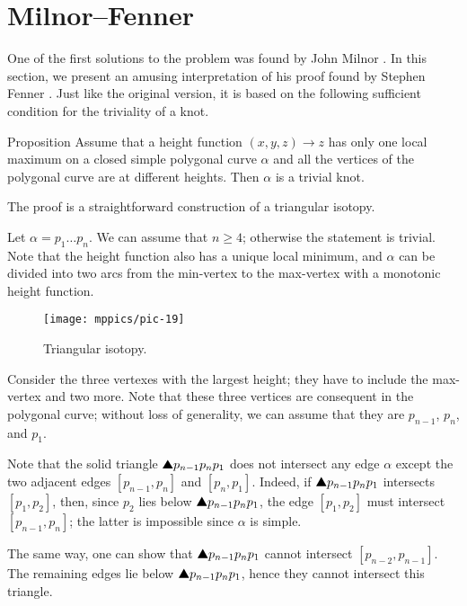 \section{Milnor--Fenner}

One of the first solutions to the problem was found by John Milnor \cite{milnor}.
In this section, we present an amusing interpretation of his proof found by Stephen Fenner \cite{ferner}.
Just like the original version, it is based on the following sufficient condition for the triviality of a knot.

\begin{thm}{Proposition}\label{prop:one-max-one-min}
Assume that a height function $(x,y,z)\to z$ 
has only one local maximum on a closed simple polygonal curve $\alpha$ and all the vertices of the polygonal curve are at different heights.
Then $\alpha$ is a trivial knot.
\end{thm}

The proof is a straightforward construction of a triangular isotopy. 

Let $\alpha=p_1\dots p_n$.
We can assume that $n\ge 4$; otherwise the statement is trivial.
Note that the height function also has a unique local minimum, and $\alpha$ can be divided into two arcs from the min-vertex to the max-vertex with a monotonic height function.

{

\begin{wrapfigure}{r}{30 mm}
\vskip-6mm
\centering
\texttt{[image: mppics/pic-19]}
\caption*{Triangular isotopy.}
\vskip0mm
\end{wrapfigure}

Consider the three vertexes with the largest height;
they have to include the max-vertex and two more.
Note that these three vertices are consequent in the polygonal curve; 
without loss of generality, we can assume that they are $p_{n-1}$, $p_n$, and $p_1$.

Note that the solid triangle $\solidtriangle p_{n-1}p_np_1$ does not intersect any edge $\alpha$ except the two adjacent edges $[p_{n-1},p_n]$ and $[p_n,p_1]$.
Indeed, if $\solidtriangle p_{n-1}p_np_1$ intersects $[p_1,p_2]$,
then, 
since $p_2$ lies below $\solidtriangle p_{n-1}p_np_1$,
the edge $[p_1,p_2]$ must intersect $[p_{n-1},p_n]$;
the latter is impossible since $\alpha$ is simple.

}

The same way, one can show that $\solidtriangle p_{n-1}p_np_1$ cannot intersect $[p_{n-2},p_{n-1}]$.
The remaining edges lie below $\solidtriangle p_{n-1}p_np_1$, hence they cannot intersect this triangle.

